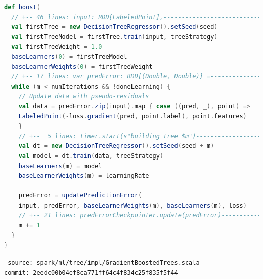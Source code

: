 \begin{frame}[fragile]
    \begin{lstlisting}[language=Scala,style=myScalastyle]
def boost(
  // +-- 46 lines: input: RDD[LabeledPoint],------------------------------
  val firstTree = new DecisionTreeRegressor().setSeed(seed)
  val firstTreeModel = firstTree.train(input, treeStrategy)
  val firstTreeWeight = 1.0
  baseLearners(0) = firstTreeModel
  baseLearnerWeights(0) = firstTreeWeight
  // +-- 17 lines: var predError: RDD[(Double, Double)] =-----------------
  while (m < numIterations && !doneLearning) {
    // Update data with pseudo-residuals
    val data = predError.zip(input).map { case ((pred, _), point) =>
    LabeledPoint(-loss.gradient(pred, point.label), point.features)
    }
    // +--  5 lines: timer.start(s"building tree $m")----------------------
    val dt = new DecisionTreeRegressor().setSeed(seed + m)
    val model = dt.train(data, treeStrategy)
    baseLearners(m) = model
    baseLearnerWeights(m) = learningRate

    predError = updatePredictionError(
    input, predError, baseLearnerWeights(m), baseLearners(m), loss)
    // +-- 21 lines: predErrorCheckpointer.update(predError)---------------
    m += 1
  }
}
    \end{lstlisting}
    {\tiny \tt
    source: spark/ml/tree/impl/GradientBoostedTrees.scala \\[-2ex]
    commit: 2eedc00b04ef8ca771ff64c4f834c25f835f5f44}
\end{frame}

